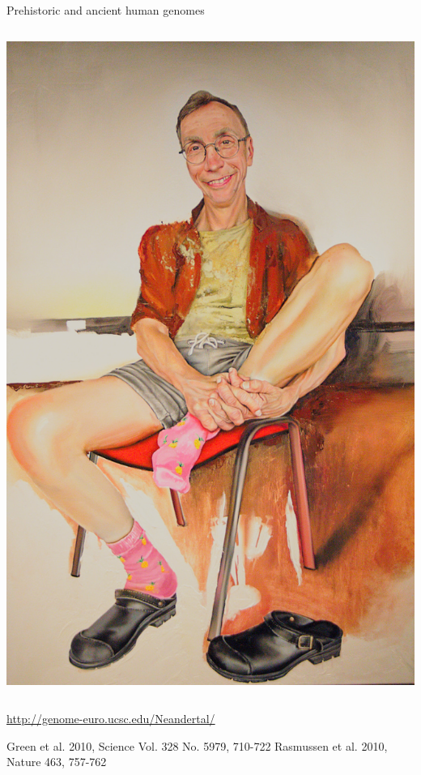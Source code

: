 \documentclass[10pt]{beamer}
\newcommand{\credit}[1]{{\vspace{\fill} \par \raggedleft \scriptsize \mdseries \color{mDarkBrown} #1 \par}}
\begin{document}
\begin{frame}{Prehistoric and ancient human genomes}
\begin{columns}
\begin{center}
	\includegraphics[width=\textwidth]{./figures/pääbo.jpg}
\end{center}
\end{columns}
\begin{columns}
	\begin{column}{0.75\textwidth}
		\url{http://genome-euro.ucsc.edu/Neandertal/}
		\credit{Green et al. 2010, Science Vol. 328 No. 5979, 710-722  \linebreak Rasmussen et al. 2010, Nature 463, 757-762}
	\end{column}
	\begin{column}{0.25\textwidth}
		\begin{center}

\end{center}
\end{column}
\end{columns}
\end{frame}
\end{document}
